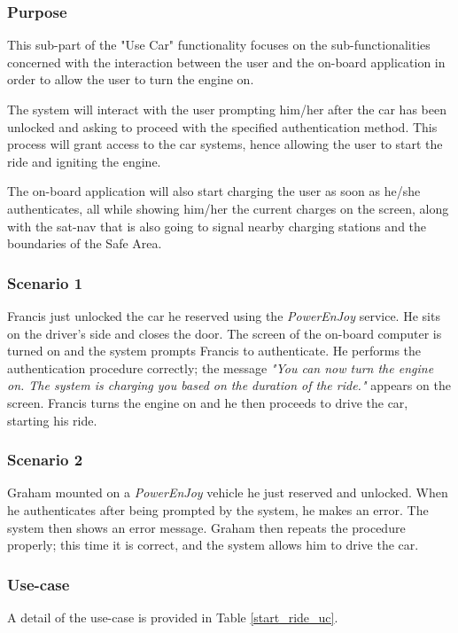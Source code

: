 \subsubsection{Purpose}
This sub-part of the "Use Car" functionality focuses on the sub-functionalities concerned with the interaction between the user and the on-board application in order to allow the user to turn the engine on.

The system will interact with the user prompting him/her after the car has been unlocked and asking to proceed with the specified authentication method. This process will grant access to the car systems, hence allowing the user to start the ride and igniting the engine.

The on-board application will also start charging the user as soon as he/she authenticates, all while showing him/her the current charges on the screen, along with the sat-nav that is also going to signal nearby charging stations and the boundaries of the Safe Area.

\subsubsection{Scenario 1}
Francis just unlocked the car he reserved using the \emph{PowerEnJoy} service. He sits on the driver's side and closes the door. The screen of the on-board computer is turned on and the system prompts Francis to authenticate. He performs the authentication procedure correctly; the message \emph{"You can now turn the engine on. The system is charging you based on the duration of the ride."} appears on the screen. Francis turns the engine on and he then proceeds to drive the car, starting his ride.

\subsubsection{Scenario 2}
Graham mounted on a \emph{PowerEnJoy} vehicle he just reserved and unlocked. When he authenticates after being prompted by the system, he makes an error. The system then shows an error message. Graham then repeats the procedure properly; this time it is correct, and the system allows him to drive the car.

\subsubsection{Use-case}
A detail of the use-case is provided in Table \ref{start_ride_uc}.

